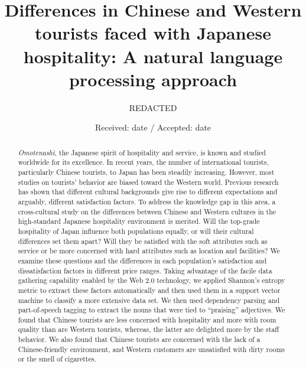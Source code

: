 \documentclass[smallextended,natbib]{svjour3}       %
\begin{document}
\title{Differences in Chinese and Western tourists faced with Japanese hospitality: A natural language processing approach}

        \author{REDACTED}



        \date{Received: date / Accepted: date}

        \maketitle

\begin{abstract}

  \textit{Omotenashi}, the Japanese spirit of hospitality and service, is known and studied worldwide for its excellence. In recent years, the number of international tourists, particularly Chinese tourists, to Japan has been steadily increasing. However, most studies on tourists’ behavior are biased toward the Western world. Previous research has shown that different cultural backgrounds give rise to different expectations and arguably, different satisfaction factors. To address the knowledge gap in this area, a cross-cultural study on the differences between Chinese and Western cultures in the high-standard Japanese hospitality environment is merited. Will the top-grade hospitality of Japan influence both populations equally, or will their cultural differences set them apart? Will they be satisfied with the soft attributes such as service or be more concerned with hard attributes such as location and facilities? We examine these questions and the differences in each population's satisfaction and dissatisfaction factors in different price ranges. Taking advantage of the facile data gathering capability enabled by the Web 2.0 technology, we applied Shannon's entropy metric to extract these factors automatically and then used them in a support vector machine to classify a more extensive data set. We then used dependency parsing and part-of-speech tagging to extract the nouns that were tied to ``praising'' adjectives. We found that Chinese tourists are less concerned with hospitality and more with room quality than are Western tourists, whereas, the latter are delighted more by the staff behavior. We also found that Chinese tourists are concerned with the lack of a Chinese-friendly environment, and Western customers are unsatisfied with dirty rooms or the smell of cigarettes.


\end{abstract}
\end{document}
